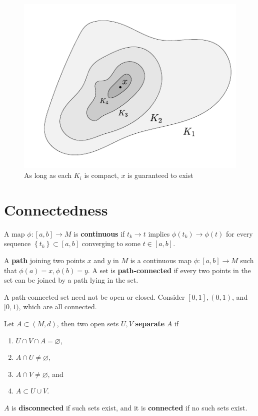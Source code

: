 \documentclass[twoside,10pt]{report}
\begin{document}
\begin{figure}[H]
	\centering
	\includegraphics[scale=1]{fig/nested-set.pdf}
	\caption{As long as each $K_i$ is compact, $x$ is guaranteed to exist}
\end{figure}


\section{Connectedness}

\begin{defn}[]
	A map $\phi:[a,b]\to M$ is \textbf{continuous} if $t_k \to t$ implies $\phi(t_k) \to \phi(t)$ for every sequence $\left\{ t_k \right\} \subset [a,b]$ converging to some $t \in [a,b]$.
\end{defn}

\begin{defn}[]
	A \textbf{path} joining two points $x $ and $y$ in $M$ is a continuous map $\phi:[a,b] \to M$ such that $\phi(a)=x, \phi(b)=y$. A set is \textbf{path-connected} if every two points in the set can be joined by a path lying in the set.
\end{defn}

A path-connected set need not be open or closed. Consider $[0,1], (0,1)$, and $[0,1)$, which are all connected.

\begin{defn}[]
	Let $A \subset (M,d)$, then two open sets $U,V$ \textbf{separate} $A$ if
	\begin{enumerate}
		\item $U \cap V \cap A = \varnothing$,
		\item $A \cap U \neq \varnothing$,
		\item $A \cap V \neq \varnothing$, and
		\item $A \subset U \cup V$.
	\end{enumerate}
	$A$ is \textbf{disconnected} if such sets exist, and it is \textbf{connected} if no such sets exist.
\end{defn}
\end{document}
